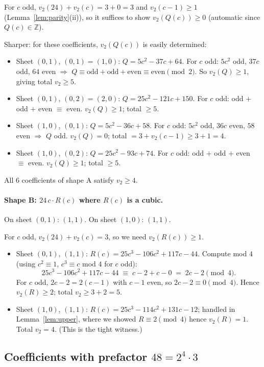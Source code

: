 \documentclass[11pt]{article}
\begin{document}
For $c$ odd, $v_2(24) + v_2(c) = 3 + 0 = 3$ and $v_2(c-1) \ge 1$
(Lemma~\ref{lem:parity}(ii)), so it suffices to show $v_2(Q(c)) \ge 0$
(automatic since $Q(c) \in \mathbb{Z}$).

Sharper: for these coefficients, $v_2(Q(c))$ is easily determined:
\begin{itemize}
\item Sheet $(0,1)$, $(0,1) = (1,0)$: $Q = 5c^2 - 37c + 64$. For $c$ odd:
$5c^2$ odd, $37c$ odd, $64$ even $\Rightarrow$ $Q \equiv \text{odd} + \text{odd} + \text{even} \equiv \text{even} \pmod 2$. So $v_2(Q) \ge 1$, giving total $v_2 \ge 5$.
\item Sheet $(0,1)$, $(0,2) = (2,0)$: $Q = 25c^2 - 121c + 150$. For $c$ odd:
odd $+$ odd $+$ even $\equiv$ even. $v_2(Q) \ge 1$; total $\ge 5$.
\item Sheet $(1,0)$, $(0,1)$: $Q = 5c^2 - 36c + 58$. For $c$ odd:
$5c^2$ odd, $36c$ even, $58$ even $\Rightarrow$ $Q$ odd. $v_2(Q) = 0$; total
$= 3 + v_2(c-1) \ge 3 + 1 = 4$.
\item Sheet $(1,0)$, $(0,2)$: $Q = 25c^2 - 93c + 74$. For $c$ odd:
odd $+$ odd $+$ even $\equiv$ even. $v_2(Q) \ge 1$; total $\ge 5$.
\end{itemize}
All $6$ coefficients of shape A satisfy $v_2 \ge 4$.

\paragraph{Shape B: $24\, c \cdot R(c)$ where $R(c)$ is a cubic.}
On sheet $(0,1)$: $(1,1)$.
On sheet $(1,0)$: $(1,1)$.

For $c$ odd, $v_2(24) + v_2(c) = 3$, so we need $v_2(R(c)) \ge 1$.

\begin{itemize}
\item Sheet $(0,1)$, $(1,1)$: $R(c) = 25c^3 - 106c^2 + 117c - 44$.
Compute mod $4$ (using $c^2 \equiv 1$, $c^3 \equiv c$ mod $4$ for $c$ odd):
\[
25c^3 - 106c^2 + 117c - 44 \;\equiv\; c - 2 + c - 0 \;=\; 2c - 2 \pmod 4.
\]
For $c$ odd, $2c - 2 = 2(c-1)$ with $c-1$ even, so $2c - 2 \equiv 0 \pmod 4$.
Hence $v_2(R) \ge 2$; total $v_2 \ge 3 + 2 = 5$.
\item Sheet $(1,0)$, $(1,1)$: $R(c) = 25c^3 - 114c^2 + 131c - 12$; handled in
Lemma~\ref{lem:upper}, where we showed $R \equiv 2 \pmod 4$ hence $v_2(R) = 1$.
Total $v_2 = 4$. (This is the tight witness.)
\end{itemize}

\subsection{Coefficients with prefactor $48 = 2^4 \cdot 3$}\label{ssec:48}
\end{document}

